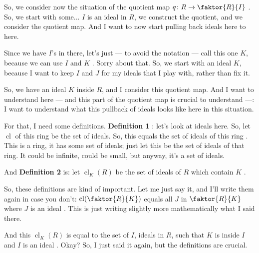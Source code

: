 \begin{speech}[00:16:01 - 00:18:40]
So, we consider now the situation of the quotient map $q \colon R \to \faktor{R}{I}$ . So, we start with some... $I$ is an ideal in $R$, we construct the quotient, and we consider the quotient map. And I want to now start pulling back ideals here to here.

Since we have $I$'s in there, let's just --- to avoid the notation --- call this one $K$, because we can use $I$ and $K$ . Sorry about that. So, we start with an ideal $K$, because I want to keep $I$ and $J$ for my ideals that I play with, rather than fix it.

So, we have an ideal $K$ inside $R$, and I consider this quotient map. And I want to understand here --- and this part of the quotient map is crucial to understand ---: I want to understand  what this pullback of ideals looks like here in this situation.

For that, I need some definitions. \textbf{Definition 1} : let's look at ideals here. So, let $\operatorname{cl}$ of this ring  be the set of ideals. So, this equals the set of ideals of this ring . This is a ring, it has some set of ideals; just let this be the set of ideals of that ring. It could be infinite, could be small, but anyway, it's a set of ideals.

And \textbf{Definition 2}  is: let $\operatorname{cl}_K(R)$  be the set of ideals of $R$ which contain $K$ .

So, these definitions are kind of important. Let me just say it, and I'll write them again in case you don't: $\operatorname{cl}(\faktor{R}{K})$ equals all $J$ in $\faktor{R}{K}$ where $J$ is an ideal . This is just writing slightly more mathematically what I said there.

And this $\operatorname{cl}_K(R)$ is equal to the set of $I$, ideals in $R$, such that $K$ is inside $I$ and $I$ is an ideal . Okay? So, I just said it again, but the definitions are crucial.
\end{speech}

